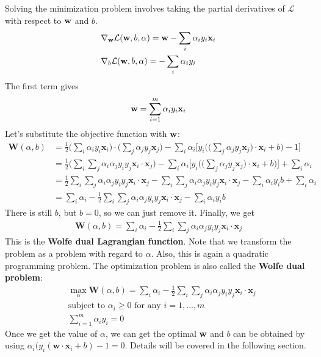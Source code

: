 Solving the minimization problem involves taking the partial derivatives of $\mathcal{L}$ with respect to ${\mathbf{w}}$ and $b$.  
\begin{align*}
	&\nabla_{\mathbf{w}}\mathcal{L}({\mathbf{w}}, b, \alpha) = {\mathbf{w}} - \sum_i \alpha_i y_i \mathbf{x}_i\\
	& \nabla_b\mathcal{L}({\mathbf{w}}, b, \alpha) = -\sum_i \alpha_i y_i
\end{align*}
The first term gives
\begin{align*}
	&{\mathbf{w}} = \sum_{i=1}^m \alpha_i y_i \mathbf{x}_i\\
\end{align*}
Let's substitute the objective function  with ${\mathbf{w}}$:
\begin{align*}
	\mathbf{W}(\alpha, b) &= \frac{1}{2}\Big(\sum_i \alpha_i y_i \mathbf{x}_i\Big)\cdot \Big(\sum_j \alpha_j y_j \mathbf{x}_j\Big) - \sum_i \alpha_i \Bigg[y_i\Bigg(\Big(\sum_j \alpha_j y_j \mathbf{x}_j\Big)\cdot \mathbf{x}_i+b\Bigg)-1\Bigg]\\
						  &= \frac{1}{2}\Big(\sum_i\sum_j \alpha_i\alpha_j y_iy_j \mathbf{x}_i\cdot \mathbf{x}_j\Big) - \sum_i \alpha_i \Bigg[y_i\Bigg(\Big(\sum_j \alpha_j y_j \mathbf{x}_j\Big)\cdot \mathbf{x}_i+b\Bigg)\Bigg]+\sum_i \alpha_i \\
						  &= \frac{1}{2}\sum_i\sum_j \alpha_i\alpha_j y_iy_j \mathbf{x}_i\cdot \mathbf{x}_j - \sum_i\sum_j \alpha_i\alpha_j y_iy_j \mathbf{x}_i \cdot \mathbf{x}_j-\sum_i \alpha_i y_i b+\sum_i \alpha_i \\
						  &= \sum_i \alpha_i -\frac{1}{2}\sum_i\sum_j \alpha_i\alpha_j y_iy_j \mathbf{x}_i\cdot \mathbf{x}_j-\sum_i \alpha_i y_i b
\end{align*}
There is still $b$, but $b=0$, so we can just remove it. Finally, we get
\begin{align}
	 \mathbf{W}(\alpha, b) = \sum_i \alpha_i -\frac{1}{2}\sum_i\sum_j \alpha_i\alpha_j y_iy_j \mathbf{x}_i\cdot \mathbf{x}_j
	 \label{eq:dual_form}
\end{align}
This is the \textbf{Wolfe dual Lagrangian function}. Note that we transform the problem as a problem with regard to $\alpha$. Also, this is again a quadratic programming problem. The optimization problem is also called the \textbf{Wolfe dual problem}: 
\begin{align*}
	 &\max_\alpha \mathbf{W}(\alpha, b) = \sum_i \alpha_i -\frac{1}{2}\sum_i\sum_j \alpha_i\alpha_j y_iy_j \mathbf{x}_i\cdot \mathbf{x}_j\\
	 &\textrm{subject to } \alpha_i\geq 0 \textrm{ for any } i=1,\dots,m\\
	 & \sum_{i=1}^m \alpha_iy_i=0
\end{align*}
Once we get the value of $\alpha$, we can get the optimal ${\mathbf{w}}$ and $b$ can be obtained by using $\alpha_i(y_i(\mathbf{w}\cdot \mathbf{x}_i+b)-1=0$. Details will be covered in the following section.


